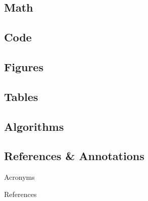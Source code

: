 \documentclass[aspectratio=169]{beamer}
\begin{document}
\subsection{Math}


\subsection{Code}


\subsection{Figures}


\subsection{Tables}


\subsection{Algorithms}


\subsection{References \& Annotations}


\appendix

\begin{frame}[allowframebreaks]{Acronyms}
    \printglossary[type=\acronymtype, nonumberlist]
\end{frame}

\begin{frame}[allowframebreaks]{References}
    \label{references}
    
\end{frame}
\end{document}
